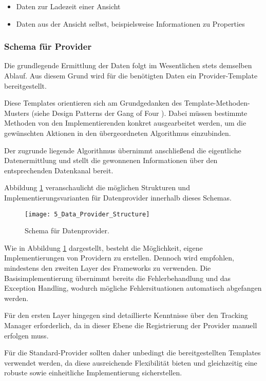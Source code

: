 \begin{itemize}
    \item Daten zur Ladezeit einer Ansicht
    \item Daten aus der Ansicht selbst, beispielsweise Informationen zu Properties
\end{itemize}

\subsubsection{Schema für Provider}
Die grundlegende Ermittlung der Daten folgt im Wesentlichen stets demselben Ablauf. Aus diesem Grund wird für die benötigten Daten ein Provider-Template bereitgestellt.

Diese Templates orientieren sich am Grundgedanken des Template-Methoden-Musters (siehe Design Patterns der Gang of Four \cite{gamma1995design}). Dabei müssen bestimmte Methoden von den Implementierenden konkret ausgearbeitet werden, um die gewünschten Aktionen in den übergeordneten Algorithmus einzubinden.

Der zugrunde liegende Algorithmus übernimmt anschließend die eigentliche Datenermittlung und stellt die gewonnenen Informationen über den entsprechenden Datenkanal bereit.

Abbildung \ref{fig:structure_data_provider} veranschaulicht die möglichen Strukturen und Implementierungsvarianten für Datenprovider innerhalb dieses Schemas.

\begin{figure}[H]
\centering
\texttt{[image: 5\_Data\_Provider\_Structure]}
\caption{Schema für Datenprovider.}
\label{fig:structure_data_provider}
\end{figure}

Wie in Abbildung \ref{fig:structure_data_provider} dargestellt, besteht die Möglichkeit, eigene Implementierungen von Providern zu erstellen. Dennoch wird empfohlen, mindestens den zweiten Layer des Frameworks zu verwenden. Die Basisimplementierung übernimmt bereits die Fehlerbehandlung und das Exception Handling, wodurch mögliche Fehlersituationen automatisch abgefangen werden.

Für den ersten Layer hingegen sind detaillierte Kenntnisse über den Tracking Manager erforderlich, da in dieser Ebene die Registrierung der Provider manuell erfolgen muss.

Für die Standard-Provider sollten daher unbedingt die bereitgestellten Templates verwendet werden, da diese ausreichende Flexibilität bieten und gleichzeitig eine robuste sowie einheitliche Implementierung sicherstellen.

